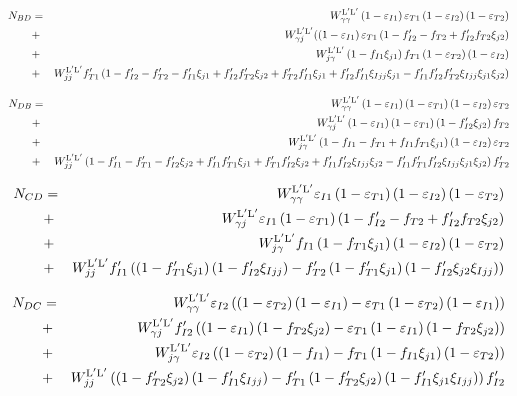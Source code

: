   \begin{eqnarray}
    N_{BD} &=& \WyyLL\left(1-\eIone\right)\eTone \left(1-\eItwo\right)\left(1-\eTtwo\right) \nonumber \\
    &+& \WyjLL(\left(1-\eIone  \right)\eTone \left(1 -\fIptwo-\fTtwo + \fIptwo\fTtwo \xijtwo\right) \nonumber \\
    &+& \WjyLL\left(1-\fIone \xijone\right)\fTone  \left(1-\eTtwo \right)\left(1-\eItwo\right)  \\
    &+& \WjjLL\fTpone \left(1-\fIptwo -\fTptwo -\fIpone \xijone+\fIptwo\fTptwo \xijtwo+\fTptwo\fIpone \xijone+\fIptwo\fIpone \xiIjj\xijone-\fIpone\fIptwo\fTptwo \xiIjj\xijone\xijtwo\right) \nonumber
  \end{eqnarray}
  
  \begin{eqnarray}
    N_{DB} &=& \WyyLL \left(1-\eIone\right) \left(1-\eTone \right)\left(1-\eItwo  \right)\eTtwo \nonumber \\
    &+& \WyjLL\left(1-\eIone\right)\left(1-\eTone \right)\left(1-\fIptwo\xijtwo\right)\fTtwo  \nonumber \\
    &+& \WjyLL\left(1-\fIone-\fTone+\fIone\fTone \xijone \right) \left(1-\eItwo  \right)\eTtwo  \\
    &+& \WjjLL\left(1-\fIpone -\fTpone -\fIptwo \xijtwo+\fIpone\fTpone \xijone+\fTpone\fIptwo \xijtwo+\fIpone\fIptwo \xiIjj\xijtwo-\fIpone\fTpone\fIptwo \xiIjj\xijone\xijtwo\right)\fTptwo \nonumber
  \end{eqnarray}
  
  \begin{eqnarray}
    N_{CD} &=& \WyyLL \eIone\left(1-\eTone\right) \left(1-\eItwo \right)\left(1-\eTtwo \right) \nonumber \\
    &+& \WyjLL\eIone \left(1-\eTone  \right) \left(1-\fIptwo -\fTtwo +\fIptwo\fTtwo\xijtwo\right) \nonumber \\
    &+& \WjyLL\fIone \left(1-\fTone \xijone\right)\left(1-\eItwo  \right)\left(1 -\eTtwo\right)  \\
    &+& \WjjLL\fIpone \left(\left(1-\fTpone\xijone\right) \left(1-\fIptwo \xiIjj\right)-\fTptwo \left(1-\fTpone  \xijone\right) \left(1-\fIptwo\xijtwo \xiIjj\right)\right) \nonumber
  \end{eqnarray}
  
  \begin{eqnarray}
    N_{DC} &=& \WyyLL \eItwo \left(\left(1-\eTtwo  \right) \left(1-\eIone  \right)-\eTone \left(1-\eTtwo   \right) \left(1-\eIone   \right)\right) \nonumber \\
    &+& \WyjLL\fIptwo \left(\left(1-\eIone  \right) \left(1-\fTtwo \xijtwo\right)-\eTone \left(1-\eIone   \right) \left(1-\fTtwo\xijtwo  \right)\right) \nonumber \\
    &+& \WjyLL\eItwo \left(\left(1-\eTtwo  \right) \left(1-\fIone  \right)-\fTone \left(1-\fIone \xijone\right) \left(1-\eTtwo   \right)\right)  \\
    &+& \WjjLL\left(\left(1-\fTptwo \xijtwo\right) \left(1-\fIpone\xiIjj\right)-\fTpone \left(1-\fTptwo  \xijtwo\right) \left(1-\fIpone \xijone \xiIjj\right)\right)\fIptwo \nonumber
  \end{eqnarray}
  
